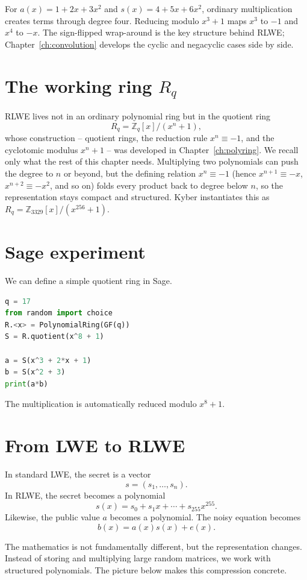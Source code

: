 For $a(x)=1+2x+3x^2$ and $s(x)=4+5x+6x^2$, ordinary multiplication creates terms through degree four. Reducing modulo $x^3+1$ maps $x^3$ to $-1$ and $x^4$ to $-x$. The sign-flipped wrap-around is the key structure behind RLWE; Chapter~\ref{ch:convolution} develops the cyclic and negacyclic cases side by side.

\section{The working ring $R_q$}

RLWE lives not in an ordinary polynomial ring but in the quotient ring
\[
R_q = \mathbb{Z}_q[x]/(x^n+1),
\]
whose construction -- quotient rings, the reduction rule $x^n\equiv-1$, and the cyclotomic modulus $x^n+1$ -- was developed in Chapter~\ref{ch:polyring}. We recall only what the rest of this chapter needs. Multiplying two polynomials can push the degree to $n$ or beyond, but the defining relation $x^n\equiv-1$ (hence $x^{n+1}\equiv-x$, $x^{n+2}\equiv-x^2$, and so on) folds every product back to degree below $n$, so the representation stays compact and structured. Kyber instantiates this as $R_q=\mathbb{Z}_{3329}[x]/(x^{256}+1)$.

\section{Sage experiment}

We can define a simple quotient ring in Sage.

\begin{lstlisting}[language=Python]
q = 17
from random import choice
R.<x> = PolynomialRing(GF(q))
S = R.quotient(x^8 + 1)

a = S(x^3 + 2*x + 1)
b = S(x^2 + 3)
print(a*b)
\end{lstlisting}

The multiplication is automatically reduced modulo $x^8+1$.

\section{From LWE to RLWE}

In standard LWE, the secret is a vector
\[
s=(s_1,\dots,s_n).
\]
In RLWE, the secret becomes a polynomial
\[
s(x)=s_0+s_1x+\cdots+s_{255}x^{255}.
\]
Likewise, the public value $a$ becomes a polynomial. The noisy equation becomes
\[
b(x)=a(x)s(x)+e(x).
\]

The mathematics is not fundamentally different, but the representation changes. Instead of storing and multiplying large random matrices, we work with structured polynomials. The picture below makes this compression concrete.

